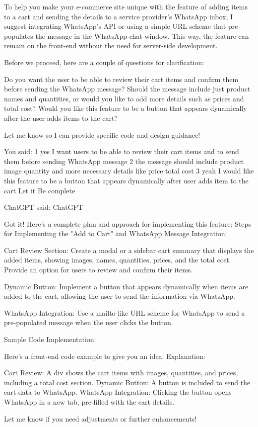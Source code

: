 To help you make your e-commerce site unique with the feature of adding items to a cart and sending the details to a service provider’s WhatsApp inbox, I suggest integrating WhatsApp's API or using a simple URL scheme that pre-populates the message in the WhatsApp chat window. This way, the feature can remain on the front-end without the need for server-side development.

Before we proceed, here are a couple of questions for clarification:

    Do you want the user to be able to review their cart items and confirm them before sending the WhatsApp message?
    Should the message include just product names and quantities, or would you like to add more details such as prices and total cost?
    Would you like this feature to be a button that appears dynamically after the user adds items to the cart?

Let me know so I can provide specific code and design guidance!

You said:
1 yes I want users to be able to review their cart items and to send them before sending WhatsApp message 
2 the message should include product image quantity and more necessary details like price total cost 
3 yeah I would like this feature to be a button that appears dynamically after user adds item to the cart 
Let it Be complete 

ChatGPT said:
ChatGPT

Got it! Here’s a complete plan and approach for implementing this feature:
Steps for Implementing the "Add to Cart" and WhatsApp Message Integration:

    Cart Review Section:
        Create a modal or a sidebar cart summary that displays the added items, showing images, names, quantities, prices, and the total cost.
        Provide an option for users to review and confirm their items.

    Dynamic Button:
        Implement a button that appears dynamically when items are added to the cart, allowing the user to send the information via WhatsApp.

    WhatsApp Integration:
        Use a mailto-like URL scheme for WhatsApp to send a pre-populated message when the user clicks the button.

Sample Code Implementation:

Here's a front-end code example to give you an idea:
Explanation:

    Cart Review: A div shows the cart items with images, quantities, and prices, including a total cost section.
    Dynamic Button: A button is included to send the cart data to WhatsApp.
    WhatsApp Integration: Clicking the button opens WhatsApp in a new tab, pre-filled with the cart details.

Let me know if you need adjustments or further enhancements!